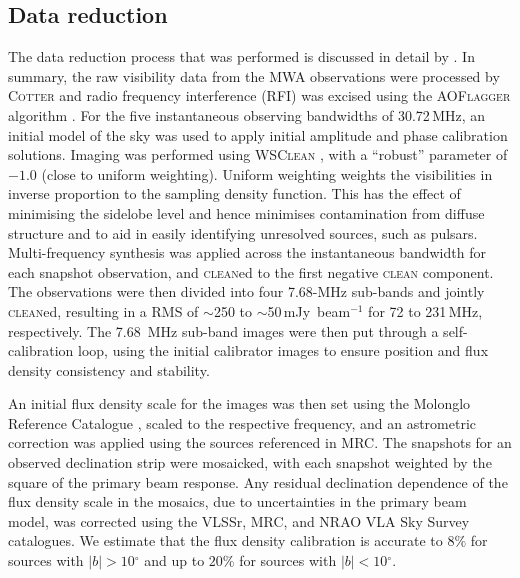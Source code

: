 \documentclass{pasa}%
\newcommand{\degree}{\ensuremath{^\circ}}
\newcommand{\changed}[1]{{#1}}
\begin{document}
\subsection{Data reduction}
The data reduction process that was performed is discussed in detail by \citet{hurleywalker16}. In summary, the raw visibility data from the MWA observations were processed by \textsc{Cotter} \citep{offringa15} and radio frequency interference (RFI) was excised using the \textsc{AOFlagger} algorithm \citep{offringa12}. For the five instantaneous observing
bandwidths of 30.72\,MHz, an initial model of the sky was used to apply initial amplitude and phase calibration solutions. Imaging was performed using \textsc{WSClean} \citep{offringa14}, with a ``robust'' parameter of $-1.0$ (close to uniform weighting). \changed{Uniform weighting weights the visibilities in inverse proportion to the sampling density function. This has the effect of minimising the sidelobe level and hence minimises contamination from diffuse structure and to aid in easily identifying unresolved sources, such as pulsars.} Multi-frequency synthesis was applied across the instantaneous
bandwidth for each snapshot observation, and \textsc{clean}ed \citep{hogbom74} to the first negative \textsc{clean} component. The observations were then divided into four 7.68-MHz sub-bands and jointly \textsc{clean}ed, resulting in a RMS of $\sim$250 to $\sim$50\,mJy~beam$^{-1}$ for 72 to 231\,MHz, respectively. The 7.68~MHz sub-band images were then put through a self-calibration loop, using the initial calibrator images to ensure position and flux density consistency and stability.

An initial flux density scale for the images was then set using the Molonglo Reference Catalogue \citep[MRC;][]{large81,large91}, scaled to the respective frequency, and an astrometric correction was applied using the sources referenced in MRC. The snapshots for an observed declination strip were mosaicked, with each snapshot weighted by the square of the primary beam response. Any residual declination dependence of the flux density scale in the mosaics, due to uncertainties in the primary beam model, was corrected using the VLSSr, MRC, and NRAO VLA Sky Survey \citep[NVSS;][]{condon98} catalogues. We estimate that the flux density calibration is accurate to $8\%$ for sources with $|b| > 10\degree$ and up to $20\%$ for sources with $|b| < 10\degree$.
\end{document}
